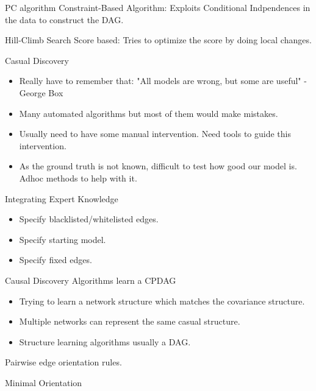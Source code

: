 \documentclass{beamer}
\begin{document}
\begin{frame}{PC algorithm}
	Constraint-Based Algorithm: Exploits Conditional Indpendences in the data to construct the DAG.

\end{frame}

\begin{frame}{Hill-Climb Search}
	Score based: Tries to optimize the score by doing local changes.
\end{frame}

\begin{frame}{Casual Discovery}
	\begin{itemize}
		\item Really have to remember that: "All models are wrong, but some are useful" - George Box
		\item Many automated algorithms but most of them would make mistakes.
		\item Usually need to have some manual intervention. Need tools to guide this intervention.
		\item As the ground truth is not known, difficult to test how good our model is. Adhoc methods to help with it.
	\end{itemize}
\end{frame}

\begin{frame}{Integrating Expert Knowledge}
	\begin{itemize}
		\item Specify blacklisted/whitelisted edges.
		\item Specify starting model.
		\item Specify fixed edges.
	\end{itemize}
\end{frame}

\begin{frame}{Causal Discovery Algorithms learn a CPDAG}
	\begin{itemize}
		\item Trying to learn a network structure which matches the covariance
			structure.
		\item Multiple networks can represent the same casual structure.
		\item Structure learning algorithms usually a DAG.
	\end{itemize}

	Pairwise edge orientation rules.
\end{frame}

\begin{frame}{Minimal Orientation}
\end{frame}
\end{document}

